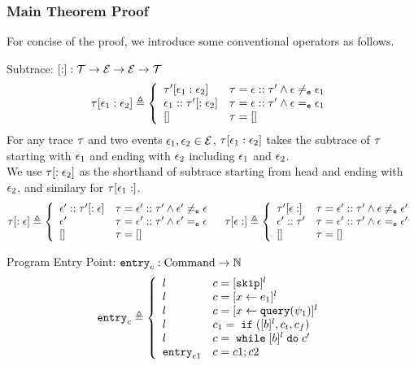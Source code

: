 \subsubsection{Main Theorem Proof}
For concise of the proof, we introduce some conventional operators as follows.
\begin{defn}[Subtrace]
  Subtrace: $[ : ] : \mathcal{{T} \to \mathcal{E} \to \mathcal{E} \to \mathcal{T}}$ 
  \[
    \trace[\event_1 : \event_2] \triangleq
    \left\{
    \begin{array}{ll} 
    \trace'[\event_1: \event_2]             & \trace = \event :: \trace' \land \event \eventneq \event_1 \\
    \event_1 :: \trace'[:\event_2]  & \trace = \event :: \trace' \land \event \eventeq \event_1 \\
    {[]} & \trace = [] \\
    \end{array}
    \right.
  \]
  For any trace $\mathtt{\tau}$ and two events $\mathtt{\epsilon}_1, \mathtt{\epsilon}_2 \in \mathcal{E}$,
  $\mathtt{\tau}[\mathtt{\epsilon}_1 : \mathtt{\epsilon}_2]$ takes the subtrace of $\mathtt{\tau}$ starting with $\mathtt{\epsilon}_1$ and ending with $\mathtt{\epsilon}_2$ including $\mathtt{\epsilon}_1$ and $\mathtt{\epsilon}_2$.
  \\
  We use $\mathtt{\tau}[:\mathtt{\epsilon}_2] $ as the shorthand of subtrace starting from head and ending with $\mathtt{\epsilon}_2$, and similary for $\mathtt{\tau}[\mathtt{\epsilon}_1:]$.
  \[
    \trace[:\event] \triangleq
    \left\{
    \begin{array}{ll} 
   \event' :: \trace'[: \event]             & \trace = \event' :: \trace' \land \event' \eventneq \event \\
    \event'  & \trace = \event' :: \trace' \land \event' \eventeq \event \\
    {[]}  & \trace = [] 
    \end{array}
    \right.
    \quad
    \trace[\event: ] \triangleq
    \left\{
    \begin{array}{ll} 
    \trace'[\event: ]     & \trace =  \event' :: \trace' \land \event \eventneq \event' \\
    \event' :: \trace'  & \trace = \event' :: \trace' \land \event \eventeq \event' \\
    {[ ] } & \trace = []
    \end{array}
    \right.
  \]
\end{defn}
%
Program Entry Point: $\mathtt{entry}_c : \mbox{Command} \to \mathbb{N}$ 
\[
  \entry_c \triangleq 
\left\{
  \begin{array}{ll} 
     l       
    & c = [\eskip]{}^l
    \\ 
    l    & c = [\assign{x}{\expr_1}]{}^l
    \\ 
    l      
    & c = \clabel{\assign{x}{\query(\qexpr_1)}}{}^l
    \\
   l
    & c_1 = \eif([b]{}^l, c_t, c_f)
    \\ 
    l         
    & c = \ewhile [b]^l \edo c'
    \\ 
    \entry_{c1}
    & c = c1;c2
  \end{array}
  \right.
\]
